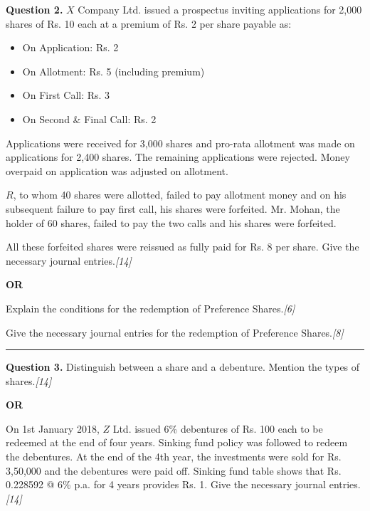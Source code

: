 \documentclass[11pt,a4paper]{article}
\newcommand{\pts}[1]{\hfill   \textit{[#1]}}
\begin{document}
\noindent   \textbf{Question 2.}
$X$ Company Ltd. issued a prospectus inviting applications for 2,000 shares of Rs. 10 each at a premium of Rs. 2 per share payable as:

\begin{itemize}[label=-,leftmargin=1.5cm]
  \item On Application: Rs. 2
  \item On Allotment: Rs. 5 (including premium)
  \item On First Call: Rs. 3
  \item On Second \& Final Call: Rs. 2
\end{itemize}
Applications were received for 3,000 shares and pro-rata allotment was made on applications for 2,400 shares. The remaining applications were rejected. Money overpaid on application was adjusted on allotment.

$R$, to whom 40 shares were allotted, failed to pay allotment money and on his subsequent failure to pay first call, his shares were forfeited. Mr. Mohan, the holder of 60 shares, failed to pay the two calls and his shares were forfeited.

All these forfeited shares were reissued as fully paid for Rs. 8 per share. Give the necessary journal entries.\pts{14}

\centerline{   \textbf{OR}}


\begin{parts}
  \item Explain the conditions for the redemption of Preference Shares.\pts{6}
  \item Give the necessary journal entries for the redemption of Preference Shares.\pts{8}
\end{parts}

\medskip\rule{\linewidth}{0.2pt}


\newpage




\noindent   \textbf{Question 3.}
Distinguish between a share and a debenture. Mention the types of shares.\pts{14}

\centerline{   \textbf{OR}}

On 1st January 2018, $Z$ Ltd. issued 6\% debentures of Rs. 100 each to be redeemed at the end of four years. Sinking fund policy was followed to redeem the debentures. At the end of the 4th year, the investments were sold for Rs. 3,50,000 and the debentures were paid off. Sinking fund table shows that Rs. 0.228592 @ 6\% p.a. for 4 years provides Rs. 1. Give the necessary journal entries.\pts{14}
\end{document}
